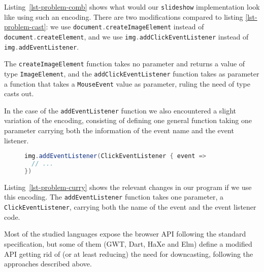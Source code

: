 \documentclass{llncs}
\newcommand{\jscode}[1]{\lstinline[language=JavaScript]|#1|}
\newcommand{\scalacode}[1]{\lstinline[language=Scala]|#1|}
\begin{document}
Listing~\ref{lst-problem-comb} shows what would our \scalacode{slideshow} implementation look like using such an encoding. There are two modifications compared to listing \ref{lst-problem-cast}: we use \scalacode{document.createImageElement} instead of \scalacode{document.createElement}, and we use \scalacode{img.addClickEventListener} instead of \scalacode{img.addEventListener}.

The \scalacode{createImageElement} function takes no parameter and returns a value of type \scalacode{ImageElement}, and the \scalacode{addClickEventListener} function takes as parameter a function that takes a \scalacode{MouseEvent} value as parameter, ruling the need of type casts out.

In the case of the \jscode{addEventListener} function we also encountered a slight variation of the encoding, consisting of defining one general function taking one parameter carrying both the 
information of the event name and the event listener.

\begin{figure}
\begin{lstlisting}[label=lst-problem-curry,language=Scala,caption={Implementation of \texttt{slideshow} using a general \texttt{addEventListener} function taking one parameter containing both the event name and the even listener}]
img.addEventListener(ClickEventListener { event =>
  // ...
})
\end{lstlisting}
\end{figure}

Listing~\ref{lst-problem-curry} shows the relevant changes in our program if we use this encoding. The \scalacode{addEventListener} function takes one parameter, a \scalacode{ClickEventListener}, carrying both the name of the event and the event listener code.

Most of the studied languages expose the browser API following the standard specification, but some of them (GWT, Dart, HaXe and Elm) define a modified API getting rid of (or at least reducing) the need for downcasting, following the approaches described above.
\end{document}
